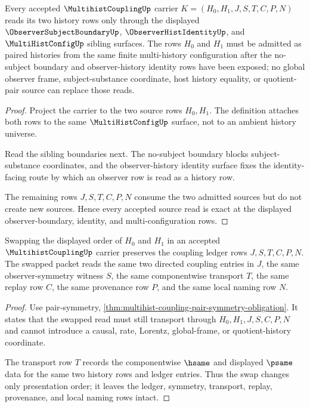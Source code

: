 \begin{theorem}
\label{thm:multihist-coupling-source-exactness}
Every accepted $\MultihistCouplingUp$ carrier $K=(H_0,H_1,J,S,T,C,P,N)$ reads its two history rows only through the displayed $\ObserverSubjectBoundaryUp$, $\ObserverHistIdentityUp$, and $\MultiHistConfigUp$ sibling surfaces. The rows $H_0$ and $H_1$ must be admitted as paired histories from the same finite multi-history configuration after the no-subject boundary and observer-history identity rows have been exposed; no global observer frame, subject-substance coordinate, host history equality, or quotient-pair source can replace those reads.
\end{theorem}
\begin{proof}
Project the carrier to the two source rows $H_0,H_1$. The definition attaches both rows to the same $\MultiHistConfigUp$ surface, not to an ambient history universe.

Read the sibling boundaries next. The no-subject boundary blocks subject-substance coordinates, and the observer-history identity surface fixes the identity-facing route by which an observer row is read as a history row.

The remaining rows $J,S,T,C,P,N$ consume the two admitted sources but do not create new sources. Hence every accepted source read is exact at the displayed observer-boundary, identity, and multi-configuration rows.
\end{proof}

\begin{theorem}
\label{thm:multihist-coupling-ledger-transport}
Swapping the displayed order of $H_0$ and $H_1$ in an accepted $\MultihistCouplingUp$ carrier preserves the coupling ledger rows $J,S,T,C,P,N$. The swapped packet reads the same two directed coupling entries in $J$, the same observer-symmetry witness $S$, the same componentwise transport $T$, the same replay row $C$, the same provenance row $P$, and the same local naming row $N$.
\end{theorem}
\begin{proof}
Use pair-symmetry, \autoref{thm:multihist-coupling-pair-symmetry-obligation}. It states that the swapped read must still transport through $H_0,H_1,J,S,C,P,N$ and cannot introduce a causal, rate, Lorentz, global-frame, or quotient-history coordinate.

The transport row $T$ records the componentwise $\hsame$ and displayed $\psame$ data for the same two history rows and ledger entries. Thus the swap changes only presentation order; it leaves the ledger, symmetry, transport, replay, provenance, and local naming rows intact.
\end{proof}

